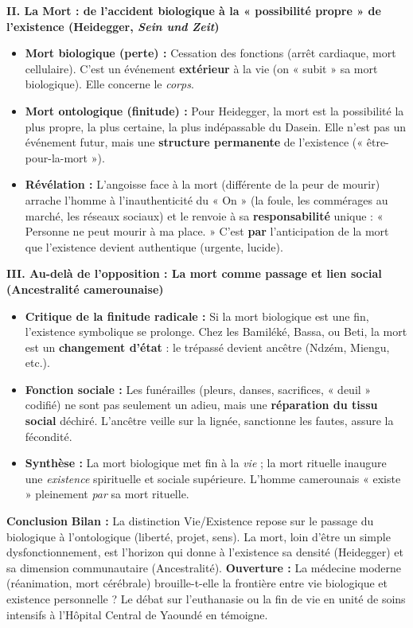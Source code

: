 \documentclass[11pt]{article}
\newcommand{\cle}[1]{{\popxbold\color{popdark}#1}}
\begin{document}
\begin{exoresolu}
\textbf{II. La Mort : de l'accident biologique à la « possibilité propre » de l'existence (Heidegger, \emph{Sein und Zeit})}
\begin{itemize}
    \item \textbf{Mort biologique (perte) :} Cessation des fonctions (arrêt cardiaque, mort cellulaire). C'est un événement \textbf{extérieur} à la vie (on « subit » sa mort biologique). Elle concerne le \emph{corps}.
    \item \textbf{Mort ontologique (finitude) :} Pour Heidegger, la mort est la \cle{possibilité la plus propre, la plus certaine, la plus indépassable} du Dasein. Elle n'est pas un événement futur, mais une \textbf{structure permanente} de l'existence (« être-pour-la-mort »).
    \item \textbf{Révélation :} L'angoisse face à la mort (différente de la peur de mourir) arrache l'homme à l'inauthenticité du « On » (la foule, les commérages au marché, les réseaux sociaux) et le renvoie à sa \textbf{responsabilité} unique : « Personne ne peut mourir à ma place. » C'est \textbf{par} l'anticipation de la mort que l'existence devient authentique (urgente, lucide).
\end{itemize}

\textbf{III. Au-delà de l'opposition : La mort comme passage et lien social (Ancestralité camerounaise)}
\begin{itemize}
    \item \textbf{Critique de la finitude radicale :} Si la mort biologique est une fin, l'existence symbolique se prolonge. Chez les Bamiléké, Bassa, ou Beti, la mort est un \textbf{changement d'état} : le trépassé devient \cle{ancêtre} (Ndzém, Miengu, etc.).
    \item \textbf{Fonction sociale :} Les funérailles (pleurs, danses, sacrifices, « deuil » codifié) ne sont pas seulement un adieu, mais une \textbf{réparation du tissu social} déchiré. L'ancêtre veille sur la lignée, sanctionne les fautes, assure la fécondité.
    \item \textbf{Synthèse :} La mort biologique met fin à la \emph{vie} ; la mort rituelle inaugure une \emph{existence} spirituelle et sociale supérieure. L'homme camerounais « existe » pleinement \emph{par} sa mort rituelle.
\end{itemize}

\textbf{Conclusion}
\textbf{Bilan :} La distinction Vie/Existence repose sur le passage du biologique à l'ontologique (liberté, projet, sens). La mort, loin d'être un simple dysfonctionnement, est l'horizon qui donne à l'existence sa densité (Heidegger) et sa dimension communautaire (Ancestralité).
\textbf{Ouverture :} La médecine moderne (réanimation, mort cérébrale) brouille-t-elle la frontière entre vie biologique et existence personnelle ? Le débat sur l'euthanasie ou la fin de vie en unité de soins intensifs à l'Hôpital Central de Yaoundé en témoigne.
\end{exoresolu}
\end{document}
